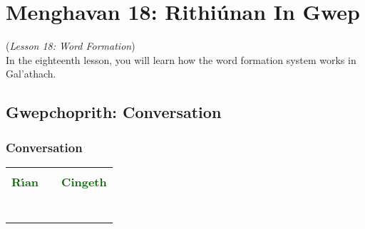 \section{Menghavan 18: Rithi\'{u}nan In Gwep}
(\textit{Lesson 18: Word Formation})\\

In the eighteenth lesson, you will learn how the word formation system works in Gal'{a}thach.

\subsection{Gwepchoprith: Conversation}
\subsubsection{Conversation}

\begin{table}[H]
\centering
    \begin{tabular}{M{3.0cm}M{10.0cm}M{3.0cm}}
     &  & \\
    \textcolor{darkgreen}{\textbf{R\'{\i}an}} &  & \textcolor{darkgreen}{\textbf{Cingeth}}\\
     &  & \\
     &  & \\
     &  & \\
     &  & \\
     &  & \\
     &  & \\
     &  & 
    \end{tabular}
\end{table}

